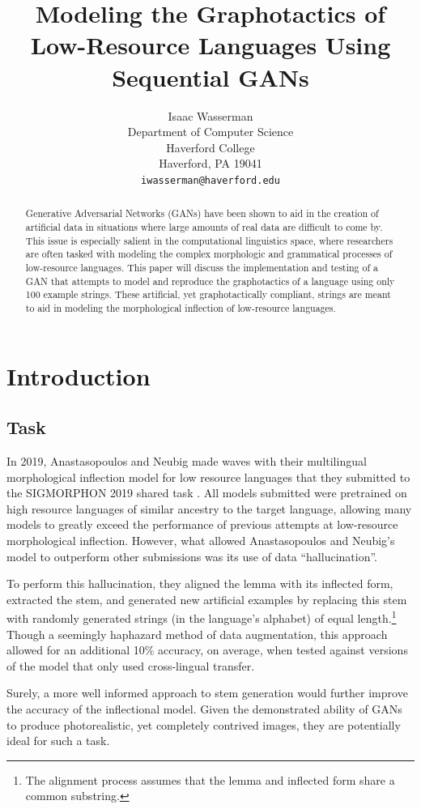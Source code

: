 \documentclass{article}
\title{Modeling the Graphotactics of Low-Resource Languages Using Sequential GANs}
\author{%
  Isaac Wasserman\\
  Department of Computer Science\\
  Haverford College\\
  Haverford, PA 19041\\
  \texttt{iwasserman@haverford.edu} \\
}
\begin{document}
  \maketitle
  \begin{abstract}
    Generative Adversarial Networks (GANs) have been shown to aid in the creation of artificial data in situations where large amounts of real data are difficult to come by. This issue is especially salient in the computational linguistics space, where researchers are often tasked with modeling the complex morphologic and grammatical processes of low-resource languages. This paper will discuss the implementation and testing of a GAN that attempts to model and reproduce the graphotactics of a language using only 100 example strings. These artificial, yet graphotactically compliant, strings are meant to aid in modeling the morphological inflection of low-resource languages.
  \end{abstract}
  \section{Introduction}
    \subsection{Task}
      In 2019, Anastasopoulos and Neubig made waves with their multilingual morphological inflection model for low resource languages \cite{CMU} that they submitted to the SIGMORPHON 2019 shared task \cite{sigmorphon2019}. All models submitted were pretrained on high resource languages of similar ancestry to the target language, allowing many models to greatly exceed the performance of previous attempts at low-resource morphological inflection. However, what allowed Anastasopoulos and Neubig's model to outperform other submissions was its use of data ``hallucination''.
    
      To perform this hallucination, they aligned the lemma with its inflected form, extracted the stem, and generated new artificial examples by replacing this stem with randomly generated strings (in the language's alphabet) of equal length.\footnote{The alignment process assumes that the lemma and inflected form share a common substring.} Though a seemingly haphazard method of data augmentation, this approach allowed for an additional 10\% accuracy, on average, when tested against versions of the model that only used cross-lingual transfer.

      Surely, a more well informed approach to stem generation would further improve the accuracy of the inflectional model. Given the demonstrated ability of GANs to produce photorealistic, yet completely contrived images, they are potentially ideal for such a task.
\end{document}
